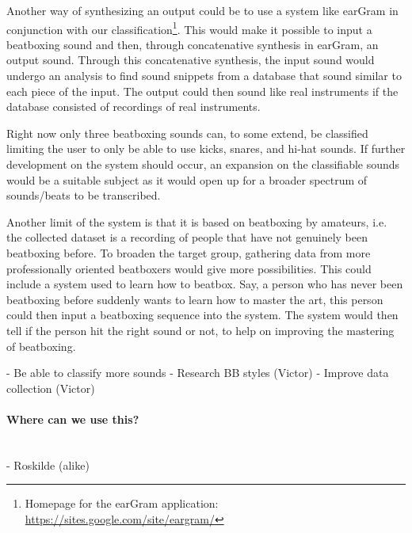 Another way of synthesizing an output could be to use a system like earGram in conjunction with our classification\footnote{Homepage for the earGram application: \url{https://sites.google.com/site/eargram/}}. This would make it possible to input a beatboxing sound and then, through concatenative synthesis in earGram, an output sound. Through this concatenative synthesis, the input sound would undergo an analysis to find sound snippets from a database that sound similar to each piece of the input. The output could then sound like real instruments if the database consisted of recordings of real instruments.

Right now only three beatboxing sounds can, to some extend, be classified limiting the user to only be able to use kicks, snares, and hi-hat sounds. If further development on the system should occur, an expansion on the classifiable sounds would be a suitable subject as it would open up for a broader spectrum of sounds/beats to be transcribed.

Another limit of the system is that it is based on beatboxing by amateurs, i.e. the collected dataset is a recording of people that have not genuinely been beatboxing before. To broaden the target group, gathering data from more professionally oriented beatboxers would give more possibilities. This could include a system used to learn how to beatbox. Say, a person who has never been beatboxing before suddenly wants to learn how to master the art, this person could then input a beatboxing sequence into the system. The system would then tell if the person hit the right sound or not, to help on improving the mastering of beatboxing.

	- Be able to classify more sounds
		- Research BB styles (Victor)
	- Improve data collection (Victor)


\paragraph{Where can we use this?} \hspace{0pt} \\


	- Roskilde (alike)
